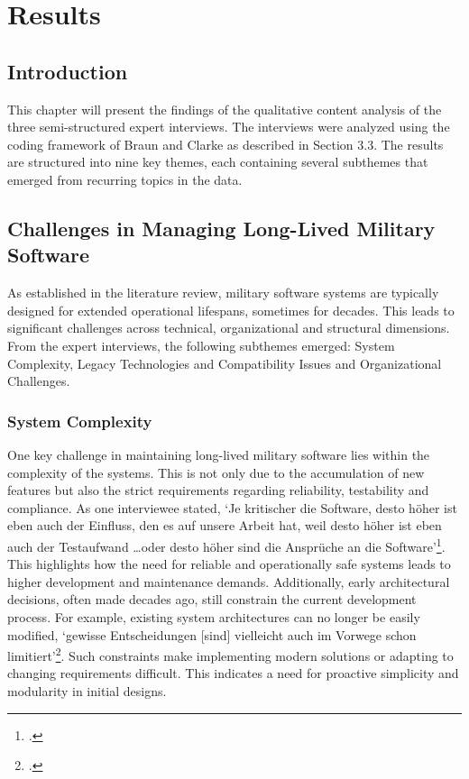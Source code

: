 \section{Results}
\subsection{Introduction}
This chapter will present the findings of the qualitative content analysis of the three semi-structured expert interviews. The interviews were analyzed using the coding framework of Braun and Clarke as described in Section 3.3.
The results are structured into nine key themes, each containing several subthemes that emerged from recurring topics in the data.
\subsection{Challenges in Managing Long-Lived Military Software}
As established in the literature review, military software systems are typically designed for extended operational lifespans, sometimes for decades. This leads to significant challenges across technical, organizational and structural dimensions.
From the expert interviews, the following subthemes emerged: System Complexity, Legacy Technologies and Compatibility Issues and Organizational Challenges.

\subsubsection{System Complexity}
One key challenge in maintaining long-lived military software lies within the complexity of the systems. This is not only due to the accumulation of new features but also the strict requirements regarding reliability, testability and compliance.
As one interviewee stated, `Je kritischer die Software, desto höher ist eben auch der Einfluss, den es auf unsere Arbeit hat, weil desto höher ist eben auch der Testaufwand \ldots oder desto höher sind die Ansprüche an die Software'\footcite[74]{Interview22025}.
This highlights how the need for reliable and operationally safe systems leads to higher development and maintenance demands. Additionally, early architectural decisions, often made decades ago, 
still constrain the current development process. For example, existing system architectures can no longer be easily modified, `gewisse Entscheidungen [sind] vielleicht auch im Vorwege schon limitiert'\footcite[63]{Interview12025}.
Such constraints make implementing modern solutions or adapting to changing requirements difficult. This indicates a need for proactive simplicity and modularity in initial designs.

